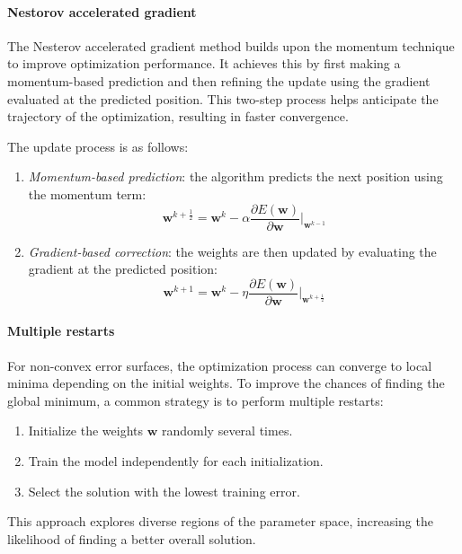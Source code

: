 \paragraph*{Nestorov accelerated gradient}
The Nesterov accelerated gradient method builds upon the momentum technique to improve optimization performance. 
It achieves this by first making a momentum-based prediction and then refining the update using the gradient evaluated at the predicted position. 
This two-step process helps anticipate the trajectory of the optimization, resulting in faster convergence.

\noindent The update process is as follows:
\begin{enumerate}
    \item \textit{Momentum-based prediction}: the algorithm predicts the next position using the momentum term:    
        \[\mathbf{w}^{k+\frac{1}{2}}=\mathbf{w}^k-\alpha\dfrac{\partial E(\mathbf{w})}{\partial \mathbf{w}}\Bigg|_{\mathbf{w}^{k-1}}\]
    \item \textit{Gradient-based correction}: the weights are then updated by evaluating the gradient at the predicted position:
        \[\mathbf{w}^{k+1}=\mathbf{w}^k-\eta\dfrac{\partial E(\mathbf{w})}{\partial \mathbf{w}}\Bigg|_{\mathbf{w}^{k+\frac{1}{2}}}\]
\end{enumerate}

\paragraph*{Multiple restarts}
For non-convex error surfaces, the optimization process can converge to local minima depending on the initial weights. 
To improve the chances of finding the global minimum, a common strategy is to perform multiple restarts:
\begin{enumerate}
    \item Initialize the weights $\mathbf{w}$ randomly several times.
    \item Train the model independently for each initialization.
    \item Select the solution with the lowest training error.
\end{enumerate}
This approach explores diverse regions of the parameter space, increasing the likelihood of finding a better overall solution.

